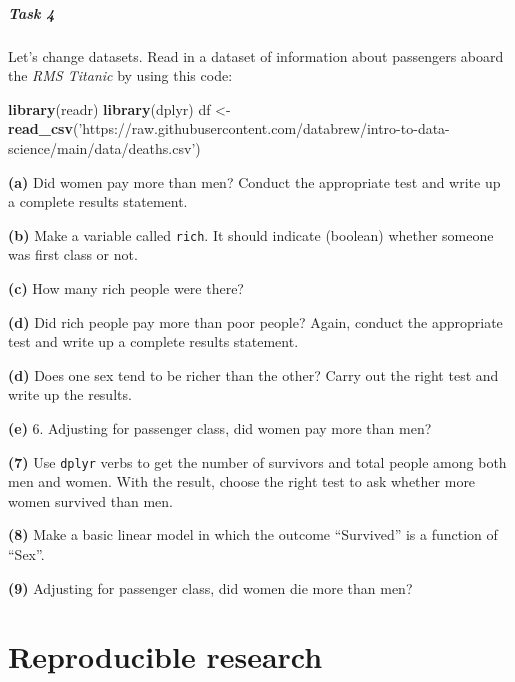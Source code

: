 \documentclass[]{book}
\newenvironment{Shaded}{\begin{snugshade}}{\end{snugshade}}
\newcommand{\KeywordTok}[1]{\textcolor[rgb]{0.13,0.29,0.53}{\textbf{#1}}}
\newcommand{\NormalTok}[1]{#1}
\newcommand{\StringTok}[1]{\textcolor[rgb]{0.31,0.60,0.02}{#1}}
\begin{document}
\hypertarget{task-4}{%
\subsubsection*{Task 4}\label{task-4}}

Let's change datasets. Read in a dataset of information about passengers aboard the \emph{RMS Titanic} by using this code:

\begin{Shaded}
\begin{Highlighting}[]
\KeywordTok{library}\NormalTok{(readr)}
\KeywordTok{library}\NormalTok{(dplyr)}
\NormalTok{df <-}\StringTok{ }\KeywordTok{read_csv}\NormalTok{(}\StringTok{'https://raw.githubusercontent.com/databrew/intro-to-data-science/main/data/deaths.csv'}\NormalTok{)}
\end{Highlighting}
\end{Shaded}

\textbf{(a)} Did women pay more than men? Conduct the appropriate test and write up a complete results statement.

\textbf{(b)} Make a variable called \texttt{rich}. It should indicate (boolean) whether someone was first class or not.

\textbf{(c)} How many rich people were there?

\textbf{(d)} Did rich people pay more than poor people? Again, conduct the appropriate test and write up a complete results statement.

\textbf{(d)} Does one sex tend to be richer than the other? Carry out the right test and write up the results.

\textbf{(e)} 6. Adjusting for passenger class, did women pay more than men?

\textbf{(7)} Use \texttt{dplyr} verbs to get the number of survivors and total people among both men and women. With the result, choose the right test to ask whether more women survived than men.

\textbf{(8)} Make a basic linear model in which the outcome ``Survived'' is a function of ``Sex''.

\textbf{(9)} Adjusting for passenger class, did women die more than men?

\hypertarget{part-reproducible-research}{%
\part{Reproducible research}\label{part-reproducible-research}}
\end{document}
